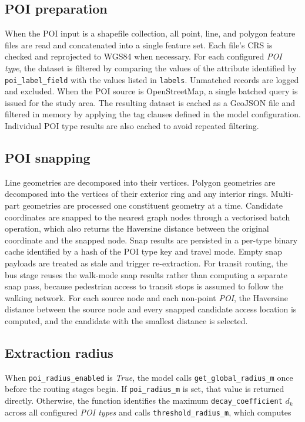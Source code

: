 \documentclass{article}
\begin{document}
\subsection{POI preparation}
When the POI input is a shapefile collection, all point, line, and polygon feature files are read and concatenated into a single feature set. Each file's CRS is checked and reprojected to WGS84 when necessary. For each configured \emph{POI type}, the dataset is filtered by comparing the values of the attribute identified by \texttt{poi\_label\_field} with the values listed in \texttt{labels}. Unmatched records are logged and excluded. When the POI source is OpenStreetMap, a single batched query is issued for the study area. The resulting dataset is cached as a GeoJSON file and filtered in memory by applying the tag clauses defined in the model configuration. Individual POI type results are also cached to avoid repeated filtering.

\subsection{POI snapping}
Line geometries are decomposed into their vertices. Polygon geometries are decomposed into the vertices of their exterior ring and any interior rings. Multi-part geometries are processed one constituent geometry at a time. Candidate coordinates are snapped to the nearest graph nodes through a vectorised batch operation, which also returns the Haversine distance between the original coordinate and the snapped node. Snap results are persisted in a per-type binary cache identified by a hash of the POI type key and travel mode. Empty snap payloads are treated as stale and trigger re-extraction. For transit routing, the bus stage reuses the walk-mode snap results rather than computing a separate snap pass, because pedestrian access to transit stops is assumed to follow the walking network. For each source node and each non-point \emph{POI}, the Haversine distance between the source node and every snapped candidate access location is
computed, and the candidate with the smallest distance is selected.

\subsection{Extraction radius}
When \texttt{poi\_radius\_enabled} is \emph{True}, the model calls
\texttt{get\_global\_radius\_m} once before the routing stages begin. If
\texttt{poi\_radius\_m} is set, that value is returned directly. Otherwise,
the function identifies the maximum \texttt{decay\_coefficient} \(d_k\)
across all configured \emph{POI types} and calls
\texttt{threshold\_radius\_m}, which computes
\end{document}

